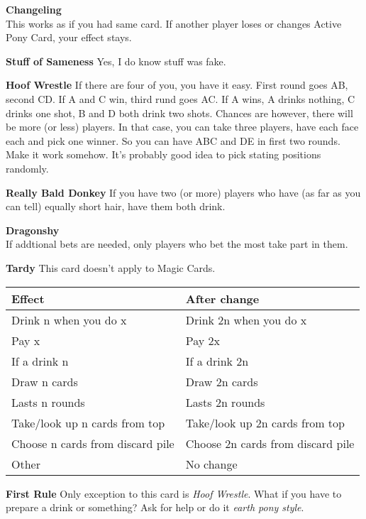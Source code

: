 \documentclass[notitlepage]{article}
\begin{document}
\textbf{Changeling}\\
This works as if you had same card. If another player loses or changes Active Pony Card, your effect stays.

\textbf{Stuff of Sameness}\newline
Yes, I do know stuff was fake.

\textbf{Hoof Wrestle}\newline
If there are four of you, you have it easy. First round goes AB, second CD. If A and C win, third rund goes AC. If A wins, A drinks nothing, C drinks one shot, B and D both drink two shots. Chances are however, there will be more (or less) players. In that case, you can take three players, have each face each and pick one winner. So you can have ABC and DE in first two rounds. Make it work somehow. It's probably good idea to pick stating positions randomly.

\textbf{Really Bald Donkey}\newline
If you have two (or more) players who have (as far as you can tell) equally short hair, have them both drink.

\textbf{Dragonshy}\\
If addtional bets are needed, only players who bet the most take part in them.

\textbf{Tardy}\newline
This card doesn't apply to Magic Cards.\\
\begin{tabular}{| l | l |}
\hline
\textbf{Effect} & \textbf{After change} \\ \hline
Drink n when you do x & Drink 2n when you do x \\ \hline
Pay x & Pay 2x \\ \hline
If a drink n & If a drink 2n \\ \hline
Draw n cards & Draw 2n cards \\ \hline
Lasts n rounds & Lasts 2n rounds \\ \hline
Take/look up n cards from top & Take/look up 2n cards from top \\ \hline
Choose n cards from discard pile & Choose 2n cards from discard pile \\ \hline
Other & No change \\ \hline
\end{tabular}

\textbf{First Rule}\newline
Only exception to this card is \textsl{Hoof Wrestle}. What if you have to prepare a drink or something? Ask for help or do it \textsl{earth pony style}.
\end{document}
